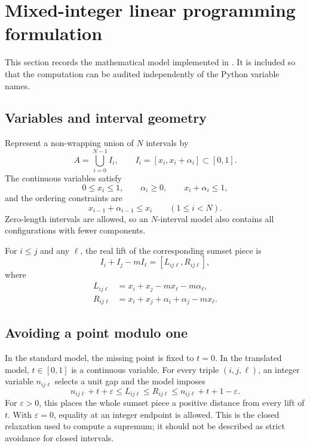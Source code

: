 \section{Mixed-integer linear programming formulation}
\label{sec:milp-formulation}

This section records the mathematical model implemented in
.  It is included so that the computation can be
audited independently of the Python variable names.

\subsection{Variables and interval geometry}

Represent a non-wrapping union of \(N\) intervals by
\[
    A=\bigcup_{i=0}^{N-1}I_i,
    \qquad
    I_i=[x_i,x_i+\alpha_i]\subset[0,1].
\]
The continuous variables satisfy
\[
    0\leq x_i\leq1,
    \qquad
    \alpha_i\geq0,
    \qquad
    x_i+\alpha_i\leq1,
\]
and the ordering constraints are
\[
    x_{i-1}+\alpha_{i-1}\leq x_i
    \qquad(1\leq i<N).
\]
Zero-length intervals are allowed, so an \(N\)-interval model also contains
all configurations with fewer components.

For \(i\leq j\) and any \(\ell\), the real lift of the corresponding sumset
piece is
\[
    I_i+I_j-mI_\ell=[L_{ij\ell},R_{ij\ell}],
\]
where
\begin{align*}
    L_{ij\ell}
      &=x_i+x_j-mx_\ell-m\alpha_\ell,\\
    R_{ij\ell}
      &=x_i+x_j+\alpha_i+\alpha_j-mx_\ell.
\end{align*}

\subsection{Avoiding a point modulo one}

In the standard model, the missing point is fixed to \(t=0\).  In the
translated model, \(t\in[0,1]\) is a continuous variable.  For every triple
\((i,j,\ell)\), an integer variable \(n_{ij\ell}\) selects a unit gap and the
model imposes
\begin{equation}
    n_{ij\ell}+t+\varepsilon\leq L_{ij\ell}
    \leq R_{ij\ell}
    \leq n_{ij\ell}+t+1-\varepsilon.
    \label{eq:lifted-milp-constraint}
\end{equation}
For \(\varepsilon>0\), this places the whole sumset piece a positive distance
from every lift of \(t\).  With \(\varepsilon=0\), equality at an integer
endpoint is allowed.  This is the closed relaxation used to compute a
supremum; it should not be described as strict avoidance for closed intervals.

